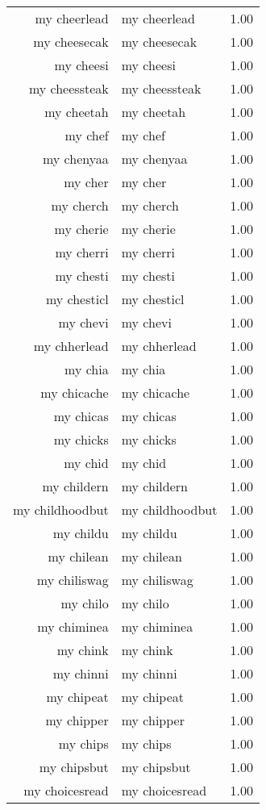 \begin{table}[ht]
\begin{tabular}{rlr}
  my cheerlead & my cheerlead & 1.00 \\ 
  my cheesecak & my cheesecak & 1.00 \\ 
  my cheesi & my cheesi & 1.00 \\ 
  my cheessteak & my cheessteak & 1.00 \\ 
  my cheetah & my cheetah & 1.00 \\ 
  my chef & my chef & 1.00 \\ 
  my chenyaa & my chenyaa & 1.00 \\ 
  my cher & my cher & 1.00 \\ 
  my cherch & my cherch & 1.00 \\ 
  my cherie & my cherie & 1.00 \\ 
  my cherri & my cherri & 1.00 \\ 
  my chesti & my chesti & 1.00 \\ 
  my chesticl & my chesticl & 1.00 \\ 
  my chevi & my chevi & 1.00 \\ 
  my chherlead & my chherlead & 1.00 \\ 
  my chia & my chia & 1.00 \\ 
  my chicache & my chicache & 1.00 \\ 
  my chicas & my chicas & 1.00 \\ 
  my chicks & my chicks & 1.00 \\ 
  my chid & my chid & 1.00 \\ 
  my childern & my childern & 1.00 \\ 
  my childhoodbut & my childhoodbut & 1.00 \\ 
  my childu & my childu & 1.00 \\ 
  my chilean & my chilean & 1.00 \\ 
  my chiliswag & my chiliswag & 1.00 \\ 
  my chilo & my chilo & 1.00 \\ 
  my chiminea & my chiminea & 1.00 \\ 
  my chink & my chink & 1.00 \\ 
  my chinni & my chinni & 1.00 \\ 
  my chipeat & my chipeat & 1.00 \\ 
  my chipper & my chipper & 1.00 \\ 
  my chips & my chips & 1.00 \\ 
  my chipsbut & my chipsbut & 1.00 \\ 
  my choicesread & my choicesread & 1.00 \\ 

\end{tabular}
\end{table}
